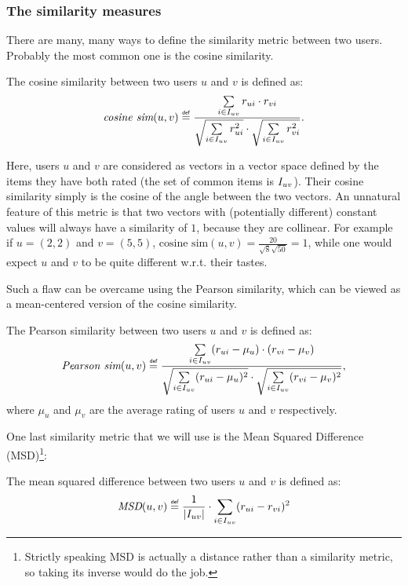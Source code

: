 \subsubsection{The similarity measures}

There are many, many ways to define the similarity metric between two users.
Probably the most common one is the cosine similarity.

\begin{definition}
  The cosine similarity between two users $u$ and $v$ is defined as:
$$
\emph{cosine sim}(u, v) \eqdef \frac{ \sum\limits_{i \in \Iuv} \rui \cdot \rvi}
{\sqrt{\sum\limits_{i \in \Iuv} \rui^2} \cdot \sqrt{\sum\limits_{i \in \Iuv}
\rvi^2}}.
$$
\end{definition}

Here, users $u$ and $v$ are considered as vectors in a vector space defined by
the items they have both rated (the set of common items is $I_{uv}$). Their
cosine similarity simply is the cosine of the angle between the two vectors. An
unnatural feature of this metric is that two vectors with (potentially
different) constant values will always have a similarity of $1$, because they
are collinear. For example if $u = (2, 2)$ and $v = (5, 5)$, $\text{cosine
sim}(u, v) = \frac{20}{\sqrt{8}\sqrt{50}} = 1$, while one would expect $u$ and
$v$ to be quite different w.r.t. their tastes.

Such a flaw can be overcame using the Pearson similarity, which can be viewed as
a mean-centered version of the cosine similarity.

\begin{definition}
  The Pearson similarity between two users $u$ and $v$ is defined as:
$$
\emph{Pearson sim}(u, v) \eqdef \frac{ \sum\limits_{i \in \Iuv}
(\rui -  \mu_u) \cdot (\rvi - \mu_{v})} {\sqrt{\sum\limits_{i
\in \Iuv} (\rui -  \mu_u)^2} \cdot \sqrt{\sum\limits_{i \in
\Iuv} (\rvi -  \mu_{v})^2}},
$$
where $\mu_u$ and $\mu_v$ are the average rating of users $u$ and $v$
respectively.
\end{definition}

One last similarity metric that we will use is the Mean Squared Difference
(MSD)\footnote{Strictly speaking MSD is actually a distance rather than a
similarity metric, so taking its inverse would do the job.}:
\begin{definition}
  The mean squared difference between two users $u$ and $v$ is defined as:
$$\emph{MSD}(u, v) \eqdef \frac{1}{|\Iuv|} \cdot \sum\limits_{i \in \Iuv} (\rui
- \rvi)^2$$
\end{definition}

